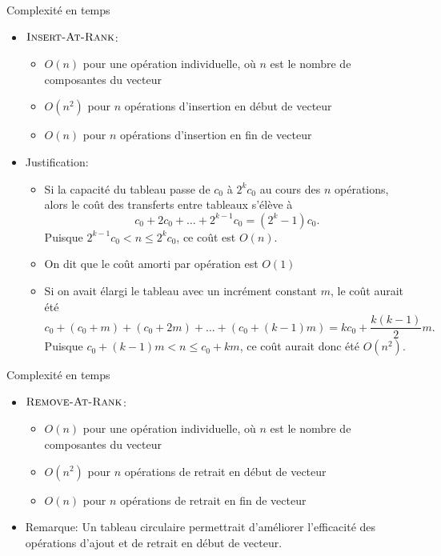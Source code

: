 \begin{frame}{Complexité en temps}\label{sec05:amortie}
\begin{itemize}
\item $\textnormal{\scshape Insert-At-Rank}$:
\begin{itemize}
\item $O(n)$ pour une opération individuelle, où $n$ est le nombre de composantes du vecteur
\item $O(n^2)$ pour $n$ opérations d'insertion en \alert{début} de vecteur
\item $O(n)$ pour $n$ opérations d'insertion en \alert{fin} de vecteur
\end{itemize}
\item Justification:
\begin{itemize}
\item Si la capacité du tableau passe de $c_0$ à $2^k c_0$ au cours des $n$ opérations, alors le coût des transferts entre tableaux s'élève à
$$c_0+2 c_0+\ldots+2^{k-1} c_0=(2^k-1) c_0.$$
Puisque $2^{k-1} c_0 < n \leq 2^k c_0$, ce coût est \alert{$O(n)$}.
\item On dit que le \alert{coût amorti} par opération est $O(1)$
\item Si on avait élargi le tableau avec un incrément constant $m$, le coût aurait été
$$c_0+(c_0+m)+(c_0+2m)+\ldots+(c_0+(k-1)m)=kc_0+\frac{k(k-1)}{2}m.$$
Puisque $c_0+(k-1)m<n\leq c_0+km$, ce coût aurait donc été \alert{$O(n^2)$}.
\end{itemize}
\end{itemize}
\end{frame}

\begin{frame}{Complexité en temps}
\begin{itemize}
\item $\textnormal{\scshape Remove-At-Rank}$:
\begin{itemize}
\item $O(n)$ pour une opération individuelle, où $n$ est le nombre de composantes du vecteur
\item $O(n^2)$ pour $n$ opérations de retrait en \alert{début} de vecteur
\item $O(n)$ pour $n$ opérations de retrait en \alert{fin} de vecteur
\end{itemize}
\item Remarque: Un tableau circulaire permettrait d'améliorer l'efficacité des opérations d'ajout et de retrait en début de vecteur.
\end{itemize}

\end{frame}

